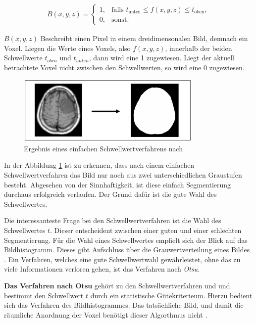 \begin{align}
	\label{equ:schwellwertverfahren}B(x, y, z) = \begin{cases}1,&\text{falls }t_{\text{unten}}\leq f(x, y, z) \leq t_{\text{oben}}, \\ 0,&\text{sonst}.\end{cases}
\end{align}

$B(x, y, z)$ Beschreibt einen Pixel in einem dreidimensonalen Bild, demnach ein Voxel.
Liegen die Werte eines Voxels, also $f(x, y, z)$, innerhalb der beiden
Schwellwerte $t_{oben}$ und $t_{unten}$, dann wird eine 1 zugewiesen. Liegt der
aktuell betrachtete Voxel nicht zwischen den Schwellwerten, so wird eine 0 zugewiesen.

\begin{figure}[h]
	\centering
	\includegraphics[width=0.8\textwidth]{img/beispiel_schwellwertverfahren.jpg}
	\caption{Ergebnis eines einfachen Schwellwertverfahrens nach \citet[Seite 96]{handels2000}}
	\label{fig:binäres_schwellwertverfahren}
\end{figure}

In der Abbildung \ref{fig:binäres_schwellwertverfahren} ist zu erkennen, dass nach
einem einfachen Schwellwertverfahren das Bild nur noch aus zwei unterschiedlichen
Graustufen besteht. Abgesehen von der Sinnhaftigkeit, ist diese einfach Segmentierung
durchaus erfolgreich verlaufen. Der Grund dafür ist die gute Wahl des
Schwellwertes.

Die interessanteste Frage bei den Schwellwertverfahren ist die Wahl des
Schwellwertes $t$. Dieser entscheident zwischen einer guten und einer schlechten
Segmentierung. Für die Wahl eines Schwellwertes empfielt sich der Blick auf das
Bildhistogramm. Dieses gibt Aufschluss über die Grauwertverteilung eines Bildes \citep[vgl.][Seite361]{lehmann2013bildverarbeitung}.
Ein Verfahren, welches eine gute Schwellwertwahl gewährleistet, ohne das zu
viele Informationen verloren gehen, ist das Verfahren nach \textit{Otsu}.

\pagebreak

\textbf{Das Verfahren nach Otsu} gehört zu den Schwellwertverfahren und und
bestimmt den Schwellwert $t$ durch ein statistische Gütekriterieum. Hierzu bedient
sich das Verfahren des Bildhistogrammes. Das tatsächliche Bild, und damit die räumliche
Anordnung der Voxel benötigt dieser Algorthmus nicht \citep[vgl.][Seite 264]{lehmann2013bildverarbeitung}.

